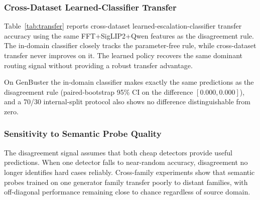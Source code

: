 \documentclass{ieeeaccess}
\begin{document}
\subsubsection{Cross-Dataset Learned-Classifier Transfer}
\label{sec:transfer}

Table~\ref{tab:transfer} reports cross-dataset learned-escalation-classifier transfer
accuracy using the same FFT+SigLIP2+Qwen features as the disagreement rule. The
in-domain classifier closely tracks the parameter-free rule, while cross-dataset
transfer never improves on it. The learned
policy recovers the same dominant routing signal without providing a robust transfer
advantage.

\begin{table}[h]
\centering
\caption{Learned escalation classifier trained on one dataset (rows) and tested on another (columns).}
\label{tab:transfer}
\end{table}

On GenBuster the in-domain classifier makes exactly the same predictions as the disagreement rule (paired-bootstrap 95\% CI on the difference $[0.000, 0.000]$), and a 70/30 internal-split protocol also shows no difference distinguishable from zero.

\subsubsection{Sensitivity to Semantic Probe Quality}

The disagreement signal assumes that both cheap detectors provide useful predictions.
When one detector falls to near-random accuracy, disagreement no longer identifies hard
cases reliably. Cross-family experiments show that semantic probes trained on one
generator family transfer poorly to distant families, with off-diagonal performance
remaining close to chance regardless of source domain.
\end{document}
